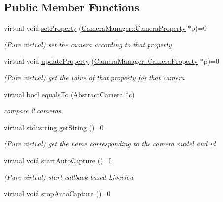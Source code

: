\subsection*{Public Member Functions}
\begin{DoxyCompactItemize}
\item 
virtual void \hyperlink{class_abstract_camera_a8b50d3e4925cfe74ed383376ba02bb5e}{set\-Property} (\hyperlink{class_camera_manager_1_1_camera_property}{Camera\-Manager\-::\-Camera\-Property} $\ast$p)=0
\begin{DoxyCompactList}\small\item\em (Pure virtual) set the camera according to that property \end{DoxyCompactList}\item 
virtual void \hyperlink{class_abstract_camera_acb48ab701cd02e78604a3ca1c695b1cf}{update\-Property} (\hyperlink{class_camera_manager_1_1_camera_property}{Camera\-Manager\-::\-Camera\-Property} $\ast$p)=0
\begin{DoxyCompactList}\small\item\em (Pure virtual) get the value of that property for that camera \end{DoxyCompactList}\item 
virtual bool \hyperlink{class_abstract_camera_a244917ab081c18caf389473847871dd6}{equals\-To} (\hyperlink{class_abstract_camera}{Abstract\-Camera} $\ast$c)
\begin{DoxyCompactList}\small\item\em compare 2 cameras \end{DoxyCompactList}\item 
virtual std\-::string \hyperlink{class_abstract_camera_a75dc6b53d5a8717944d5e8ded9609611}{get\-String} ()=0
\begin{DoxyCompactList}\small\item\em (Pure virtual) get the name corresponding to the camera model and id \end{DoxyCompactList}\item 
\hypertarget{class_abstract_camera_a2f47d9877c5308856f42c94723faca33}{virtual void \hyperlink{class_abstract_camera_a2f47d9877c5308856f42c94723faca33}{start\-Auto\-Capture} ()=0}\label{class_abstract_camera_a2f47d9877c5308856f42c94723faca33}

\begin{DoxyCompactList}\small\item\em (Pure virtual) start callback based Liveview \end{DoxyCompactList}\item 
\hypertarget{class_abstract_camera_a08bd5e2c3f8a92187f36e1f6322eccb5}{virtual void \hyperlink{class_abstract_camera_a08bd5e2c3f8a92187f36e1f6322eccb5}{stop\-Auto\-Capture} ()=0}\label{class_abstract_camera_a08bd5e2c3f8a92187f36e1f6322eccb5}


\end{DoxyCompactItemize}
